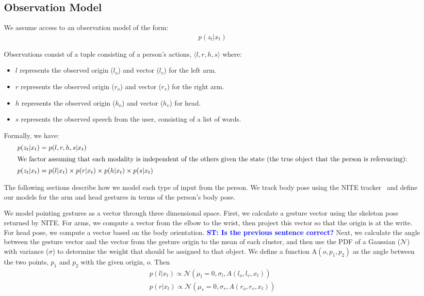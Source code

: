 \documentclass[letterpaper, 10 pt, conference]{ieeeconf}
\newcommand{\stnote}[1]{\textcolor{Blue}{\textbf{ST: #1}}}
\begin{document}
\subsection{Observation Model}

We assume access to an observation model of the form:
\begin{align}
p(z_t | x_t)
\end{align}

Observations consist of a tuple consisting of a person's actions,
$\langle l, r, h, s\rangle $ where:
\begin{itemize}
	\item $l$ represents the observed origin ($l_o$) and vector ($l_v$) for the left arm.
	\item $r$ represents the observed origin  ($r_o$) and vector ($r_v$)  for the right arm.
	\item $h$ represents the observed origin  ($h_o$) and vector ($h_v$)  for head.
	\item $s$ represents the observed speech from the user,
          consisting of a list of words.
	\end{itemize}

Formally, we have:
\begin{align}
p(z_t | x_t) &= p(l, r, h, s | x_t)\\
\intertext{We factor assuming that each modality is independent of the others given the state (the true object that the person is referencing):}
p(z_t | x_t) &= p(l | x_t) \times p(r | x_t) \times p(h | x_t) \times p(s | x_t)
\end{align}

\noindent The following sections describe how we model each type of
input from the person.  We track body pose using the NITE
tracker~\citep{openni} and define our models for the arm and head
gestures in terms of the person's body pose.

  We model pointing gestures as a vector
through three dimensional space.  First, we calculate a gesture vector
using the skeleton pose returned by NITE.  For arms, we compute a
vector from the elbow to the wrist, then project this vector so that the origin is at the write.  For head pose, we compute a
vector based on the body orientation.  \stnote{Is the previous
  sentence correct?} Next, we calculate the angle between the gesture
vector and the vector from the gesture origin to the mean of each
cluster, and then use the PDF of a Gaussian ($\mathcal{N}$) with
variance ($\sigma$) to determine the weight that should be assigned to
that object. We define a function $\mbox{A}(o, p_1, p_2)$ as the angle
between the two points, $p_1$ and $p_2$ with the given origin, $o$.
Then
\begin{align}
p(l | x_t) \propto \mathcal{N}(\mu_l=0, \sigma_l,A(l_o, l_v, x_t))\\
p(r | x_t) \propto \mathcal{N}(\mu_r=0, \sigma_r,A(r_o, r_v, x_t))
\end{align}
\end{document}
